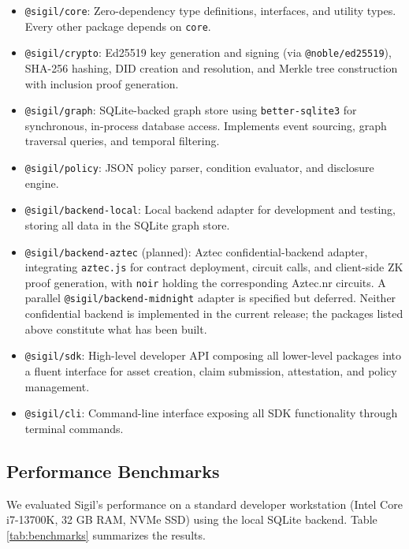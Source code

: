 \documentclass[conference]{IEEEtran}
\begin{document}
\begin{itemize}
  \item \texttt{@sigil/core}: Zero-dependency type definitions, interfaces,
        and utility types.  Every other package depends on \texttt{core}.
  \item \texttt{@sigil/crypto}: Ed25519 key generation and signing (via
        \texttt{@noble/ed25519}), SHA-256 hashing, DID creation and
        resolution, and Merkle tree construction with inclusion proof
        generation.
  \item \texttt{@sigil/graph}: SQLite-backed graph store using
        \texttt{better-sqlite3} for synchronous, in-process database access.
        Implements event sourcing, graph traversal queries, and temporal
        filtering.
  \item \texttt{@sigil/policy}: JSON policy parser, condition evaluator, and
        disclosure engine.
  \item \texttt{@sigil/backend-local}: Local backend adapter for development
        and testing, storing all data in the SQLite graph store.
  \item \texttt{@sigil/backend-aztec} (planned): Aztec confidential-backend
        adapter, integrating \texttt{aztec.js} for contract deployment, circuit
        calls, and client-side ZK proof generation, with \texttt{noir} holding
        the corresponding Aztec.nr circuits.  A parallel
        \texttt{@sigil/backend-midnight} adapter is specified but deferred.
        Neither confidential backend is implemented in the current release; the
        packages listed above constitute what has been built.
  \item \texttt{@sigil/sdk}: High-level developer API composing all
        lower-level packages into a fluent interface for asset creation, claim
        submission, attestation, and policy management.
  \item \texttt{@sigil/cli}: Command-line interface exposing all SDK
        functionality through terminal commands.
\end{itemize}

\subsection{Performance Benchmarks}

We evaluated Sigil's performance on a standard developer workstation (Intel
Core i7-13700K, 32 GB RAM, NVMe SSD) using the local SQLite backend.  Table
\ref{tab:benchmarks} summarizes the results.
\end{document}
